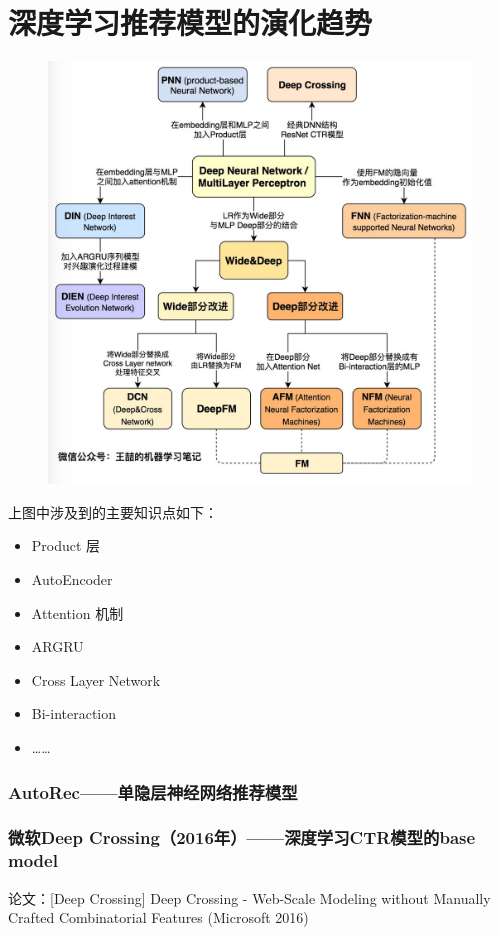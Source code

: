 \documentclass[12pt]{article}
\begin{document}
\part{深度学习推荐模型的演化趋势}
\begin{figure}[H]
    \centering
    \includegraphics[width=1\textwidth]{fig/Deep_Learning_Reference_System_Evolution.jpg}
\end{figure}

上图中涉及到的主要知识点如下：
\begin{itemize}
\setlength{\itemsep}{0pt}
\setlength{\parsep}{0pt}
\setlength{\parskip}{0pt}
    \item Product 层
    \item AutoEncoder
    \item Attention 机制
    \item ARGRU
    \item Cross Layer Network
    \item Bi-interaction
    \item ……
\end{itemize}

\section{AutoRec——单隐层神经网络推荐模型}

\section{微软Deep Crossing（2016年）——深度学习CTR模型的base model}
论文：[Deep Crossing] Deep Crossing - Web-Scale Modeling without Manually Crafted Combinatorial Features (Microsoft 2016)
\end{document}
